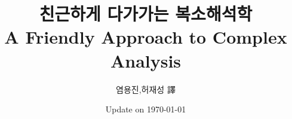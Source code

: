 \documentclass[chapter,10.5pt]{oblivoir}
\numberwithin{equation}{chapter}
\numberwithin{figure}{chapter}
\def\bf{\bfseries}
\begin{document}

\title{\bf {\huge 친근하게 다가가는 복소해석학}\\ A Friendly Approach to Complex Analysis}
\author{염용진,허재성 譯}
\date{Update on \today}
\maketitle
\thispagestyle{empty}

\clearpage



\clearpage
\setcounter{tocdepth}{2}
\setcounter{minitocdepth}{1} 

\renewcommand{\contentsname}{목 차}
\tableofcontents
    
    
%
%

\end{document}
